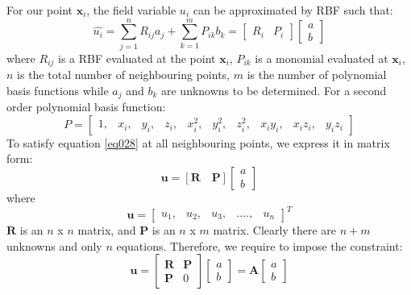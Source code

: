 \documentclass[12pt]{extarticle}
\begin{document}
\vspace{5 mm}
For our point $\textbf{x}_i$, the field variable $u_{i}$ can be approximated by RBF such that:
\begin{equation}
    \hat{u_{i}} = \sum_{j=1}^{n}R_{ij}a_j+\sum_{k=1}^{m}P_{ik}b_k=  \begin{bmatrix} R_{i} & P_{i} \end{bmatrix} \begin{bmatrix} a \\ b \end{bmatrix}
   \label{eq028}
\end{equation}
where $R_{ij}$ is a RBF evaluated at the point $\textbf{x}_i$, $P_{ik}$ is a monomial evaluated at $\textbf{x}_i$, $n$ is the total number of neighbouring points, $m$ is the number of polynomial basis functions while $a_j$ and $b_k$ are unknowns to be determined. For a second order polynomial basis function:
\begin{equation}
    P =\begin{bmatrix} 1,& x_i,& y_i,& z_i,& x_i^2,& y_i^2,& z_i^2,& x_iy_i,& x_iz_i,& y_iz_i \end{bmatrix}
      \label{eq032}
     \end{equation}
To satisfy equation \ref{eq028} at all neighbouring points, we express it in matrix form:
\begin{equation}
\textbf{u}=[\textbf{R} \quad \textbf{P}]  \begin{bmatrix} a \\ b \end{bmatrix}
  \label{eq034}
\end{equation}
where
  \begin{equation}
      \textbf{u} = \begin{bmatrix}u_{1},& u_{2},& u_{3},& ....,& u_{n}\end{bmatrix}^{T}
   \label{eq035}
   \end{equation}
$\textbf{R}$ is an $n$ x $n$ matrix, and $\textbf{P}$ is an $n$ x $m$ matrix. Clearly there are $n+m$ unknowns and only $n$ equations. Therefore, we require to impose the constraint:
\begin{equation}
\textbf{u} = \begin{bmatrix}
\textbf{R} & \textbf{P} \\
\textbf{P} & 0
\end{bmatrix}
\begin{bmatrix} a \\ b \end{bmatrix} = \textbf{A} \begin{bmatrix} a \\ b \end{bmatrix}
  \label{eq039}
\end{equation}
\end{document}
